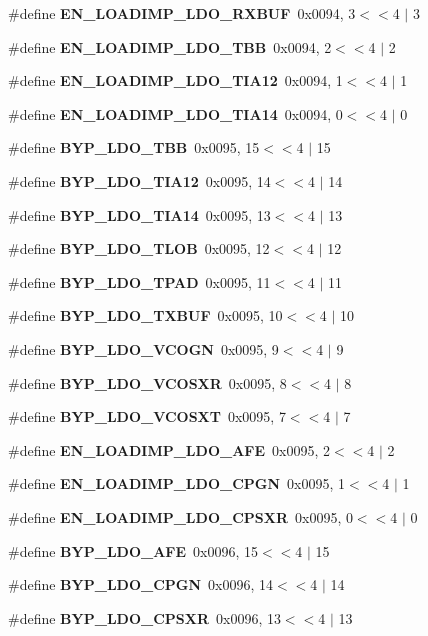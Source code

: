 \begin{DoxyCompactItemize}
\item 
\#define {\bf E\+N\+\_\+\+L\+O\+A\+D\+I\+M\+P\+\_\+\+L\+D\+O\+\_\+\+R\+X\+B\+UF}~0x0094, 3$<$$<$4 $\vert$  3
\item 
\#define {\bf E\+N\+\_\+\+L\+O\+A\+D\+I\+M\+P\+\_\+\+L\+D\+O\+\_\+\+T\+BB}~0x0094, 2$<$$<$4 $\vert$  2
\item 
\#define {\bf E\+N\+\_\+\+L\+O\+A\+D\+I\+M\+P\+\_\+\+L\+D\+O\+\_\+\+T\+I\+A12}~0x0094, 1$<$$<$4 $\vert$  1
\item 
\#define {\bf E\+N\+\_\+\+L\+O\+A\+D\+I\+M\+P\+\_\+\+L\+D\+O\+\_\+\+T\+I\+A14}~0x0094, 0$<$$<$4 $\vert$  0
\item 
\#define {\bf B\+Y\+P\+\_\+\+L\+D\+O\+\_\+\+T\+BB}~0x0095, 15$<$$<$4 $\vert$  15
\item 
\#define {\bf B\+Y\+P\+\_\+\+L\+D\+O\+\_\+\+T\+I\+A12}~0x0095, 14$<$$<$4 $\vert$  14
\item 
\#define {\bf B\+Y\+P\+\_\+\+L\+D\+O\+\_\+\+T\+I\+A14}~0x0095, 13$<$$<$4 $\vert$  13
\item 
\#define {\bf B\+Y\+P\+\_\+\+L\+D\+O\+\_\+\+T\+L\+OB}~0x0095, 12$<$$<$4 $\vert$  12
\item 
\#define {\bf B\+Y\+P\+\_\+\+L\+D\+O\+\_\+\+T\+P\+AD}~0x0095, 11$<$$<$4 $\vert$  11
\item 
\#define {\bf B\+Y\+P\+\_\+\+L\+D\+O\+\_\+\+T\+X\+B\+UF}~0x0095, 10$<$$<$4 $\vert$  10
\item 
\#define {\bf B\+Y\+P\+\_\+\+L\+D\+O\+\_\+\+V\+C\+O\+GN}~0x0095, 9$<$$<$4 $\vert$  9
\item 
\#define {\bf B\+Y\+P\+\_\+\+L\+D\+O\+\_\+\+V\+C\+O\+S\+XR}~0x0095, 8$<$$<$4 $\vert$  8
\item 
\#define {\bf B\+Y\+P\+\_\+\+L\+D\+O\+\_\+\+V\+C\+O\+S\+XT}~0x0095, 7$<$$<$4 $\vert$  7
\item 
\#define {\bf E\+N\+\_\+\+L\+O\+A\+D\+I\+M\+P\+\_\+\+L\+D\+O\+\_\+\+A\+FE}~0x0095, 2$<$$<$4 $\vert$  2
\item 
\#define {\bf E\+N\+\_\+\+L\+O\+A\+D\+I\+M\+P\+\_\+\+L\+D\+O\+\_\+\+C\+P\+GN}~0x0095, 1$<$$<$4 $\vert$  1
\item 
\#define {\bf E\+N\+\_\+\+L\+O\+A\+D\+I\+M\+P\+\_\+\+L\+D\+O\+\_\+\+C\+P\+S\+XR}~0x0095, 0$<$$<$4 $\vert$  0
\item 
\#define {\bf B\+Y\+P\+\_\+\+L\+D\+O\+\_\+\+A\+FE}~0x0096, 15$<$$<$4 $\vert$  15
\item 
\#define {\bf B\+Y\+P\+\_\+\+L\+D\+O\+\_\+\+C\+P\+GN}~0x0096, 14$<$$<$4 $\vert$  14
\item 
\#define {\bf B\+Y\+P\+\_\+\+L\+D\+O\+\_\+\+C\+P\+S\+XR}~0x0096, 13$<$$<$4 $\vert$  13
$$
\end{DoxyCompactItemize}
